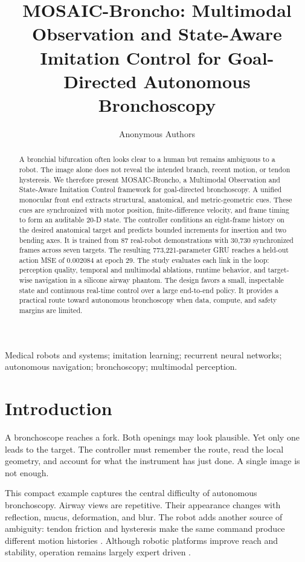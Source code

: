 \documentclass[letterpaper,10pt,conference]{ieeeconf}
\title{MOSAIC-Broncho: Multimodal Observation and State-Aware\\
Imitation Control for Goal-Directed Autonomous Bronchoscopy}
\author{Anonymous Authors}
\begin{document}
\maketitle
\thispagestyle{empty}
\pagestyle{empty}

\begin{abstract}
A bronchial bifurcation often looks clear to a human but remains ambiguous to a
robot. The image alone does not reveal the intended branch, recent motion, or
tendon hysteresis. We therefore present MOSAIC-Broncho, a Multimodal
Observation and State-Aware Imitation Control framework for goal-directed
bronchoscopy. A unified monocular front end extracts structural, anatomical,
and metric-geometric cues. These cues are synchronized with motor position,
finite-difference velocity, and frame timing to form an auditable 20-D state.
The controller conditions an eight-frame history on the desired anatomical
target and predicts bounded increments for insertion and two bending axes. It
is trained from 87 real-robot demonstrations with 30,730 synchronized frames
across seven targets. The resulting 773,221-parameter GRU reaches a held-out
action MSE of 0.002084 at epoch 29. The study evaluates each link in the loop:
perception quality, temporal and multimodal ablations, runtime behavior, and
target-wise navigation in a silicone airway phantom. The design favors a small,
inspectable state and continuous real-time control over a large end-to-end
policy. It provides a practical route toward autonomous bronchoscopy when data,
compute, and safety margins are limited.
\end{abstract}

\begin{keywords}
Medical robots and systems; imitation learning; recurrent neural networks;
autonomous navigation; bronchoscopy; multimodal perception.
\end{keywords}

\section{Introduction}

A bronchoscope reaches a fork. Both openings may look plausible. Yet only one
leads to the target. The controller must remember the route, read the local
geometry, and account for what the instrument has just done. A single image is
not enough.

This compact example captures the central difficulty of autonomous
bronchoscopy. Airway views are repetitive. Their appearance changes with
reflection, mucus, deformation, and blur. The robot adds another source of
ambiguity: tendon friction and hysteresis make the same command produce
different motion histories \cite{webster2010continuum,camarillo2008mechanics}.
Although robotic platforms improve reach and stability, operation remains
largely expert driven \cite{fielding2019firsthuman,chaddha2019multicenter,
rojassolano2018feasibility}.
\end{document}

